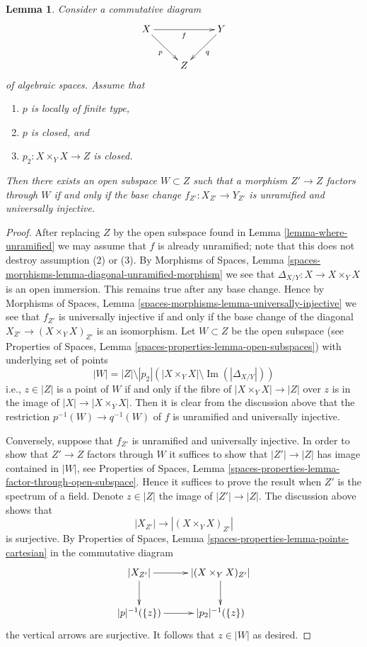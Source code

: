 \documentclass[10pt,a4paper]{amsart}
\theoremstyle{plain}
\newtheorem{lemma}[subsection]{Lemma}
\theoremstyle{definition}
\theoremstyle{remark}
\numberwithin{equation}{subsection}
\def\Im{\mathop{\mathrm{Im}}}
\begin{document}
\begin{lemma}
\label{lemma-where-unramified-universally-injective}
Consider a commutative diagram
$$
\xymatrix{
X \ar[rr]_f \ar[rd]_p & & Y \ar[ld]^q \\
& Z
}
$$
of algebraic spaces. Assume that
\begin{enumerate}
\item $p$ is locally of finite type,
\item $p$ is closed, and
\item $p_2 : X \times_Y X \to Z$ is closed.
\end{enumerate}
Then there exists an open subspace $W \subset Z$
such that a morphism $Z' \to Z$ factors through $W$ if and only if the
base change $f_{Z'} : X_{Z'} \to Y_{Z'}$ is unramified and universally
injective.
\end{lemma}

\begin{proof}
After replacing $Z$ by the open subspace found in
Lemma \ref{lemma-where-unramified}
we may assume that $f$ is already unramified; note that this does not
destroy assumption (2) or (3). By
Morphisms of Spaces, Lemma
\ref{spaces-morphisms-lemma-diagonal-unramified-morphism}
we see that $\Delta_{X/Y} : X \to X \times_Y X$ is an open immersion.
This remains true after any base change. Hence by
Morphisms of Spaces, Lemma
\ref{spaces-morphisms-lemma-universally-injective}
we see that $f_{Z'}$ is universally injective if and only if
the base change of the diagonal $X_{Z'} \to (X \times_Y X)_{Z'}$
is an isomorphism. Let $W \subset Z$ be the open subspace
(see
Properties of Spaces, Lemma
\ref{spaces-properties-lemma-open-subspaces})
with underlying set of points
$$
|W| = |Z| \setminus
|p_2|\left(|X \times_Y X| \setminus \Im(|\Delta_{X/Y}|)\right)
$$
i.e., $z \in |Z|$ is a point of $W$ if and only if the fibre of
$|X \times_Y X| \to |Z|$ over $z$ is in the image of
$|X| \to |X \times_Y X|$. Then it is clear from the discussion above
that the restriction $p^{-1}(W) \to q^{-1}(W)$ of $f$ is
unramified and universally injective.

\medskip\noindent
Conversely, suppose that $f_{Z'}$ is unramified and universally injective.
In order to show that $Z' \to Z$ factors through $W$ it suffices to show
that $|Z'| \to |Z|$ has image contained in $|W|$, see
Properties of Spaces, Lemma
\ref{spaces-properties-lemma-factor-through-open-subspace}.
Hence it suffices to prove the result when $Z'$ is the spectrum of a field.
Denote $z \in |Z|$ the image of $|Z'| \to |Z|$. The discussion above shows
that
$$
|X_{Z'}| \longrightarrow |(X \times_Y X)_{Z'}|
$$
is surjective. By
Properties of Spaces,
Lemma \ref{spaces-properties-lemma-points-cartesian}
in the commutative diagram
$$
\xymatrix{
|X_{Z'}| \ar[d] \ar[r] &
|(X \times_Y X)_{Z'}| \ar[d] \\
|p|^{-1}(\{z\}) \ar[r] &
|p_2|^{-1}(\{z\})
}
$$
the vertical arrows are surjective. It follows that $z \in |W|$ as desired.
\end{proof}
\end{document}
